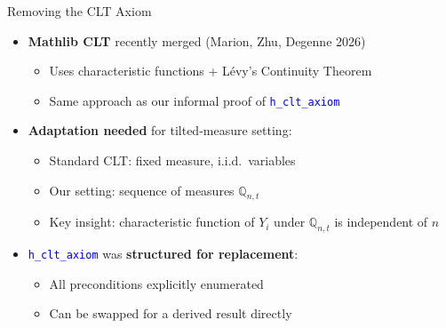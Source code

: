 \documentclass[aspectratio=169]{beamer}
\newcommand{\Q}{\mathbb{Q}}
\newcommand{\leancode}[1]{\textcolor{blue}{\nolinkurl{#1}}}
\begin{document}

\begin{frame}{Removing the CLT Axiom}
  \begin{itemize}
    \item \textbf{Mathlib CLT} recently merged (Marion, Zhu, Degenne 2026)
      \begin{itemize}
        \item Uses characteristic functions + L\'evy's Continuity Theorem
        \item Same approach as our informal proof of \leancode{h\_clt\_axiom}
      \end{itemize}

      \vspace{0.3cm}
    \item \textbf{Adaptation needed} for tilted-measure setting:
      \begin{itemize}
        \item Standard CLT: fixed measure, i.i.d.\ variables
        \item Our setting: sequence of measures $\Q_{n,t}$
        \item Key insight: characteristic function of $Y_i$ under $\Q_{n,t}$ is independent of $n$
      \end{itemize}

      \vspace{0.3cm}
    \item \leancode{h\_clt\_axiom} was \textbf{structured for replacement}:
      \begin{itemize}
        \item All preconditions explicitly enumerated
        \item Can be swapped for a derived result directly
      \end{itemize}
  \end{itemize}
\end{frame}
\end{document}
